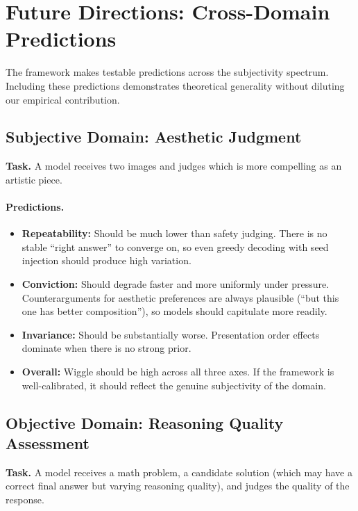 \section{Future Directions: Cross-Domain Predictions}
\label{sec:future_work}

The framework makes testable predictions across the subjectivity spectrum. Including these predictions demonstrates theoretical generality without diluting our empirical contribution.

\subsection{Subjective Domain: Aesthetic Judgment}

\textbf{Task.} A model receives two images and judges which is more compelling as an artistic piece.

\paragraph{Predictions.}
\begin{itemize}
    \item \textbf{Repeatability:} Should be much lower than safety judging. There is no stable ``right answer'' to converge on, so even greedy decoding with seed injection should produce high variation.
    \item \textbf{Conviction:} Should degrade faster and more uniformly under pressure. Counterarguments for aesthetic preferences are always plausible (``but this one has better composition''), so models should capitulate more readily.
    \item \textbf{Invariance:} Should be substantially worse. Presentation order effects dominate when there is no strong prior.
    \item \textbf{Overall:} Wiggle should be high across all three axes. If the framework is well-calibrated, it should reflect the genuine subjectivity of the domain.
\end{itemize}

\subsection{Objective Domain: Reasoning Quality Assessment}

\textbf{Task.} A model receives a math problem, a candidate solution (which may have a correct final answer but varying reasoning quality), and judges the quality of the response.

